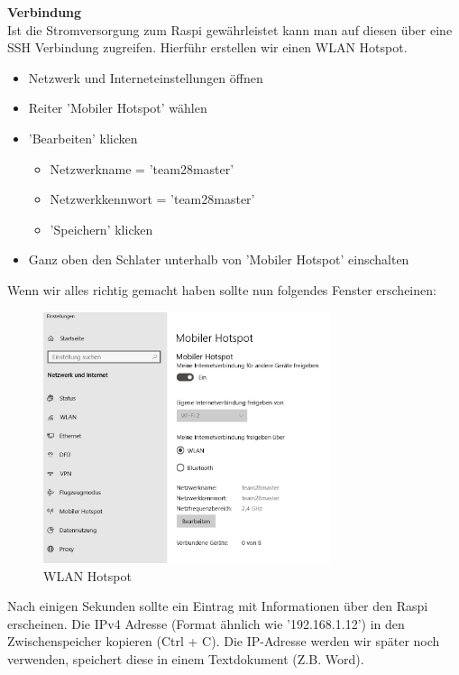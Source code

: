 \documentclass[../../main.tex]{subfiles}
\begin{document}
\textbf{Verbindung}\\
Ist die Stromversorgung zum Raspi gewährleistet kann man auf diesen über eine SSH Verbindung zugreifen. Hierführ erstellen wir einen WLAN Hotspot.
\begin{itemize}
    \item Netzwerk und Interneteinstellungen öffnen
    \item Reiter 'Mobiler Hotspot' wählen
    \item 'Bearbeiten' klicken
    \begin{itemize}
        \item Netzwerkname = 'team28master'
        \item Netzwerkkennwort = 'team28master'
        \item 'Speichern' klicken
    \end{itemize}
    \item Ganz oben den Schlater unterhalb von 'Mobiler Hotspot' einschalten
\end{itemize}

Wenn wir alles richtig gemacht haben sollte nun folgendes Fenster erscheinen:
\begin{figure}[H] \centering
    \includegraphics[width=0.75\textwidth]{HotSpot}
    \caption{WLAN Hotspot}
    \label{fig:HotSpot}
\end{figure}

Nach einigen Sekunden sollte ein Eintrag mit Informationen über den Raspi erscheinen.
Die IPv4 Adresse (Format ähnlich wie '192.168.1.12') in den Zwischenspeicher kopieren (Ctrl + C). Die IP-Adresse werden wir später noch verwenden, speichert diese in einem Textdokument (Z.B. Word). \\
\end{document}
